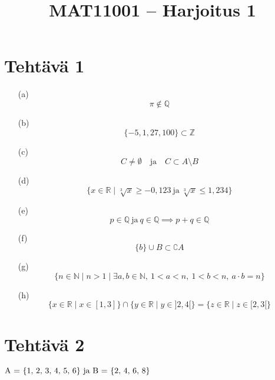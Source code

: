\documentclass{article}
\begin{document}
	
	\title{MAT11001 – Harjoitus 1}
	\date{}
	\maketitle
	
	
	\section*{Tehtävä 1}

	
\begin{enumerate}


	\item[(a)]
	\[
	\pi \notin \mathbb{Q}
	\]	
	
	\item[(b)]
	\[
	\{-5, 1, 27, 100\} \subset \mathbb{Z}
	\]

	\item[(c)]
	\[
	C \neq \emptyset \quad \text{ja} \quad C \subset A \setminus B
	\]

	\item[(d)]
	\[
	\{ x \in \mathbb{R} \mid  \sqrt[3]{x} \geq -0,123 \ \text{ja} \  \sqrt[3]{x} \leq 1,234 \}
	\]

	\item[(e)]
	\[
	p \in \mathbb{Q} \ \text{ja} \ q \in \mathbb{Q} \implies p + q \in \mathbb{Q}
	\]

	\item[(f)]
	\[
	\{b\} \cup B \subset \complement A
	\]

	\item[(g)]
	\[
	\{n \in \mathbb{N} \mid n > 1 \mid \exists a, b \in \mathbb{N}, \ 1 < a < n, \ 1 < b < n, \ a \cdot b = n \} 
	\]

	\item[(h)]
	\[
	\{ x \in \mathbb{R} \mid x \in [1, 3]\} \cap \{ y \in \mathbb{R} \mid y \in ]2, 4[\} = \{ z \in \mathbb{R} \mid z \in [2, 3[\}
	\]

	
\end{enumerate}




\newpage

	\section*{Tehtävä 2}

	\( $A = \{1, 2, 3, 4, 5, 6\}$ \ \text{ja} \ $B = \{2, 4, 6, 8\}$\)
\end{document}
